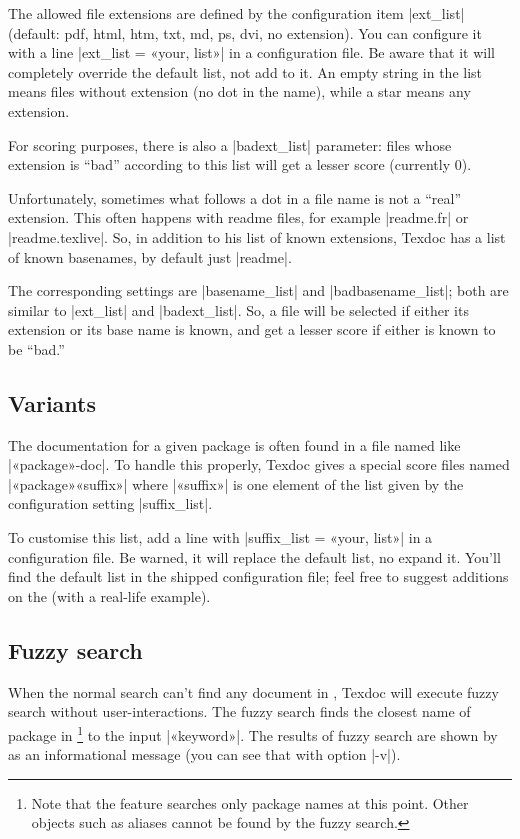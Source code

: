 \documentclass[draft]{texdoc-doc}
\begin{document}
The allowed file extensions are defined by the configuration item |ext_list|
(default: pdf, html, htm, txt, md, ps, dvi, no extension). You can configure it
with a line |ext_list = «your, list»| in a configuration file. Be aware
that it will completely override the default list, not add to it. An empty
string in the list means files without extension (no dot in the name), while a
star means any extension.

For scoring purposes, there is also a |badext_list| parameter: files whose
extension is ``bad'' according to this list will get a lesser score (currently
0).

Unfortunately, sometimes what follows a dot in a file name is not a ``real''
extension. This often happens with readme files, for example |readme.fr| or
|readme.texlive|. So, in addition to his list of known extensions, Texdoc has
a list of known basenames, by default just |readme|.

The corresponding settings are |basename_list| and |badbasename_list|; both
are similar to |ext_list| and |badext_list|. So, a file will be selected if
either its extension or its base name is known, and get a lesser score if
either is known to be ``bad.''

\subsection{Variants}
\label{sec:variants}

The documentation for a given package is often found in a file named like
|«package»-doc|. To handle this properly, Texdoc gives a special score files
named |«package»«suffix»| where |«suffix»| is one element of the list given by
the configuration setting |suffix_list|.

To customise this list, add a line with |suffix_list = «your, list»| in a
configuration file. Be warned, it will replace the default list, no expand
it. You'll find the default list in the shipped configuration file; feel free
to suggest additions on the {\TexdocML} (with a real-life example).

\subsection{Fuzzy search}
\label{sec:fuzzy}

When the normal search can't find any document in {\TL}, Texdoc will
execute fuzzy search without user-interactions. The fuzzy search finds the
closest name of package in {\TL}\footnote{Note that the feature searches
only package names at this point. Other objects such as aliases cannot be found
by the fuzzy search.} to the input |«keyword»|. The results of fuzzy search are
shown by as an informational message (you can see that with option |-v|).
\end{document}
